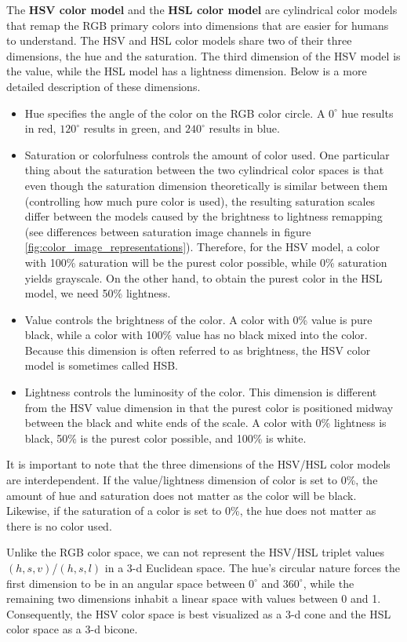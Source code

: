 The \textbf{HSV color model} and the \textbf{HSL color model} are cylindrical color models that remap the RGB primary colors into dimensions that are easier for humans to understand. The HSV and HSL color models share two of their three dimensions, the hue and the saturation. The third dimension of the HSV model is the value, while the HSL model has a lightness dimension. Below is a more detailed description of these dimensions.

\begin{itemize}
	\item Hue specifies the angle of the color on the RGB color circle. A $0^\circ$ hue results in red, $120^\circ$ results in green, and $240^\circ$ results in blue.
	\item Saturation or colorfulness controls the amount of color used. One particular thing about the saturation between the two cylindrical color spaces is that even though the saturation dimension theoretically is similar between them (controlling how much pure color is used), the resulting saturation scales differ between the models caused by the brightness to lightness remapping (see differences between saturation image channels in figure \ref{fig:color_image_representations}). Therefore, for the HSV model, a color with 100\% saturation will be the purest color possible, while 0\% saturation yields grayscale. On the other hand, to obtain the purest color in the HSL model, we need 50\% lightness.
	\item Value controls the brightness of the color. A color with 0\% value is pure black, while a color with 100\% value has no black mixed into the color. Because this dimension is often referred to as brightness, the HSV color model is sometimes called HSB.
	\item Lightness controls the luminosity of the color. This dimension is different from the HSV value dimension in that the purest color is positioned midway between the black and white ends of the scale. A color with 0\% lightness is black, 50\% is the purest color possible, and 100\% is white.
\end{itemize}

It is important to note that the three dimensions of the HSV/HSL color models are interdependent. If the value/lightness dimension of color is set to 0\%, the amount of hue and saturation does not matter as the color will be black. Likewise, if the saturation of a color is set to 0\%, the hue does not matter as there is no color used.

Unlike the RGB color space, we can not represent the HSV/HSL triplet values $(h,s,v)$/$(h,s,l)$ in a 3-d Euclidean space. The hue's circular nature forces the first dimension to be in an angular space between $0^\circ$ and $360^\circ$, while the remaining two dimensions inhabit a linear space with values between 0 and 1. Consequently, the HSV color space is best visualized as a 3-d cone and the HSL color space as a 3-d bicone.

